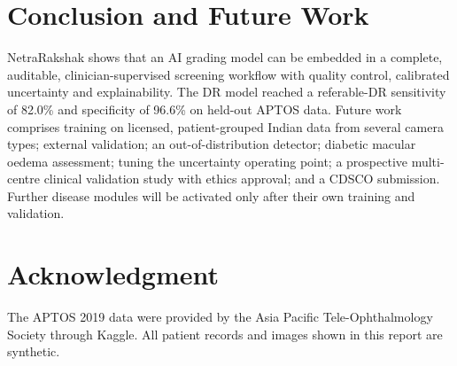 \documentclass[conference]{IEEEtran}
\begin{document}
\section{Conclusion and Future Work}
NetraRakshak shows that an AI grading model can be embedded in a complete, auditable, clinician-supervised screening
workflow with quality control, calibrated uncertainty and explainability. The DR model reached a referable-DR
sensitivity of 82.0\% and specificity of 96.6\% on held-out APTOS data. Future work comprises training on licensed,
patient-grouped Indian data from several camera types; external validation; an out-of-distribution detector;
diabetic macular oedema assessment; tuning the uncertainty operating point; a prospective multi-centre clinical
validation study with ethics approval; and a CDSCO submission. Further disease modules will be activated only after
their own training and validation.

\section*{Acknowledgment}
The APTOS 2019 data were provided by the Asia Pacific Tele-Ophthalmology Society through Kaggle. All patient records and
images shown in this report are synthetic.
\end{document}
